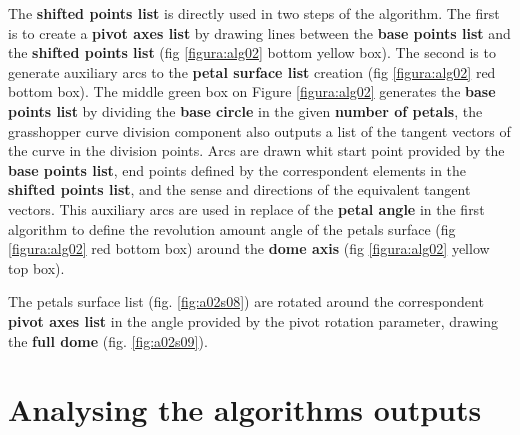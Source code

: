 \documentclass[preprint,12pt,3p]{elsarticle}
\begin{document}
The \textbf{shifted points list} is directly used in two steps of the algorithm. The first is to create a \textbf{pivot axes list} by drawing lines between the \textbf{base points list} and the \textbf{shifted points list} (fig \ref{figura:alg02} bottom yellow box). The second is to generate auxiliary arcs to the \textbf{petal surface list} creation (fig \ref{figura:alg02} red bottom box). The middle green box on Figure \ref{figura:alg02} generates the \textbf{base points list} by dividing the \textbf{base circle} in the given \textbf{number of petals}, the grasshopper curve division component also outputs a list of the tangent vectors of the curve in the division points. Arcs are drawn whit start point provided by the \textbf{base points list}, end points defined by the correspondent elements in the \textbf{shifted points list}, and the sense and directions of the equivalent tangent vectors. This auxiliary arcs are used in replace of the \textbf{petal angle} in the first algorithm to define the revolution amount angle of the petals surface (fig \ref{figura:alg02} red bottom box) around the \textbf{dome axis} (fig \ref{figura:alg02} yellow top box).

The petals surface list (fig. \ref{fig:a02s08}) are rotated around the correspondent \textbf{pivot axes list} in the angle provided by the pivot rotation parameter, drawing the \textbf{full dome} (fig. \ref{fig:a02s09}).

\section{Analysing the algorithms outputs}
\label{outs01}
\end{document}
